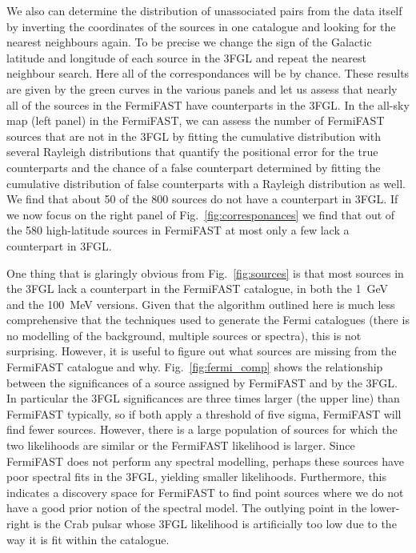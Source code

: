 \documentclass[useAMS,usenatbib]{mn2e}
\begin{document}
We also can determine the distribution of unassociated pairs from the
data itself by inverting the coordinates of the sources in one
catalogue and looking for the nearest neighbours again.  To be precise
we change the sign of the Galactic latitude and longitude of each
source in the 3FGL and repeat the nearest neighbour search.  Here all
of the correspondances will be by chance.  These results are given by
the green curves in the various panels and let us assess that nearly
all of the sources in the FermiFAST have counterparts in the 3FGL.  In
the all-sky map (left panel) in the FermiFAST, we can assess the
number of FermiFAST sources that are not in the 3FGL by fitting the
cumulative distribution with several Rayleigh distributions that
quantify the positional error for the true counterparts and the chance
of a false counterpart determined by fitting the cumulative
distribution of false counterparts with a Rayleigh distribution as
well.  We find that about 50 of the 800 sources do not have a
counterpart in 3FGL.  If we now focus on the right panel of
Fig.~\ref{fig:corresponances} we find that out of the 580
high-latitude sources in FermiFAST at most only a few lack a
counterpart in 3FGL.

One thing that is glaringly obvious from Fig.~\ref{fig:sources} is
that most sources in the 3FGL lack a counterpart in the FermiFAST
catalogue, in both the 1~GeV and the 100~MeV versions.  Given that the
algorithm outlined here is much less comprehensive that the techniques
used to generate the Fermi catalogues (there is no modelling of the
background, multiple sources or spectra), this is not surprising.
However, it is useful to figure out what sources are missing from the
FermiFAST catalogue and why.  Fig.~\ref{fig:fermi_comp} 
shows the relationship between the significances of a source
assigned by FermiFAST and by the 3FGL.  In particular the 3FGL
significances are three times larger (the upper line) than FermiFAST
typically, so if both apply a threshold of five sigma, FermiFAST will
find fewer sources.  However, there is a large population of sources
for which the two likelihoods are similar or the FermiFAST likelihood
is larger.  Since FermiFAST does not perform any spectral modelling,
perhaps these sources have poor spectral fits in the 3FGL, yielding
smaller likelihoods.  Furthermore, this indicates a discovery space
for FermiFAST to find point sources where we do not have a good prior
notion of the spectral model.  The outlying point in the lower-right
is the Crab pulsar whose 3FGL likelihood is artificially too low due
to the way it is fit within the catalogue.
\end{document}

